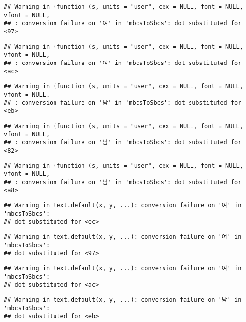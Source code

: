 \documentclass[
]{article}
\begin{document}
\begin{verbatim}
## Warning in (function (s, units = "user", cex = NULL, font = NULL, vfont = NULL,
## : conversion failure on '여' in 'mbcsToSbcs': dot substituted for <97>
\end{verbatim}

\begin{verbatim}
## Warning in (function (s, units = "user", cex = NULL, font = NULL, vfont = NULL,
## : conversion failure on '여' in 'mbcsToSbcs': dot substituted for <ac>
\end{verbatim}

\begin{verbatim}
## Warning in (function (s, units = "user", cex = NULL, font = NULL, vfont = NULL,
## : conversion failure on '남' in 'mbcsToSbcs': dot substituted for <eb>
\end{verbatim}

\begin{verbatim}
## Warning in (function (s, units = "user", cex = NULL, font = NULL, vfont = NULL,
## : conversion failure on '남' in 'mbcsToSbcs': dot substituted for <82>
\end{verbatim}

\begin{verbatim}
## Warning in (function (s, units = "user", cex = NULL, font = NULL, vfont = NULL,
## : conversion failure on '남' in 'mbcsToSbcs': dot substituted for <a8>
\end{verbatim}

\begin{verbatim}
## Warning in text.default(x, y, ...): conversion failure on '여' in 'mbcsToSbcs':
## dot substituted for <ec>
\end{verbatim}

\begin{verbatim}
## Warning in text.default(x, y, ...): conversion failure on '여' in 'mbcsToSbcs':
## dot substituted for <97>
\end{verbatim}

\begin{verbatim}
## Warning in text.default(x, y, ...): conversion failure on '여' in 'mbcsToSbcs':
## dot substituted for <ac>
\end{verbatim}

\begin{verbatim}
## Warning in text.default(x, y, ...): conversion failure on '남' in 'mbcsToSbcs':
## dot substituted for <eb>
\end{verbatim}
\end{document}

